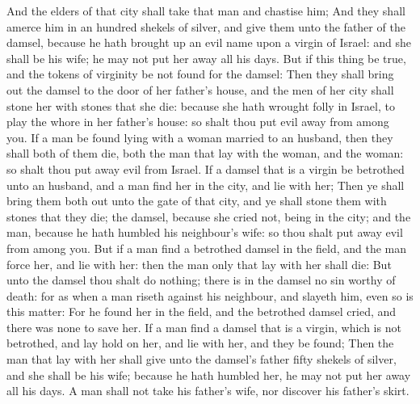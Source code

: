 \begin{biblechapter}
\verse And the elders of that city shall take that man and chastise him;
\verse And they shall amerce him in an hundred shekels of silver, and give them unto the father of the damsel, because he hath brought up an evil name upon a virgin of Israel: and she shall be his wife; he may not put her away all his days.
\verse But if this thing be true, and the tokens of virginity be not found for the damsel:
\verse Then they shall bring out the damsel to the door of her father's house, and the men of her city shall stone her with stones that she die: because she hath wrought folly in Israel, to play the whore in her father's house: so shalt thou put evil away from among you.
\verse If a man be found lying with a woman married to an husband, then they shall both of them die, both the man that lay with the woman, and the woman: so shalt thou put away evil from Israel.
\verse If a damsel that is a virgin be betrothed unto an husband, and a man find her in the city, and lie with her;
\verse Then ye shall bring them both out unto the gate of that city, and ye shall stone them with stones that they die; the damsel, because she cried not, being in the city; and the man, because he hath humbled his neighbour's wife: so thou shalt put away evil from among you.
\verse But if a man find a betrothed damsel in the field, and the man force her, and lie with her: then the man only that lay with her shall die:
\verse But unto the damsel thou shalt do nothing; there is in the damsel no sin worthy of death: for as when a man riseth against his neighbour, and slayeth him, even so is this matter:
\verse For he found her in the field, and the betrothed damsel cried, and there was none to save her.
\verse If a man find a damsel that is a virgin, which is not betrothed, and lay hold on her, and lie with her, and they be found;
\verse Then the man that lay with her shall give unto the damsel's father fifty shekels of silver, and she shall be his wife; because he hath humbled her, he may not put her away all his days.
\verse A man shall not take his father's wife, nor discover his father's skirt.
\end{biblechapter}

